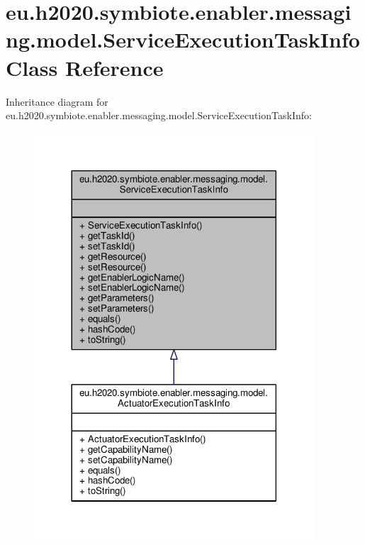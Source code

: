 \hypertarget{classeu_1_1h2020_1_1symbiote_1_1enabler_1_1messaging_1_1model_1_1ServiceExecutionTaskInfo}{}\section{eu.\+h2020.\+symbiote.\+enabler.\+messaging.\+model.\+Service\+Execution\+Task\+Info Class Reference}
\label{classeu_1_1h2020_1_1symbiote_1_1enabler_1_1messaging_1_1model_1_1ServiceExecutionTaskInfo}


Inheritance diagram for eu.\+h2020.\+symbiote.\+enabler.\+messaging.\+model.\+Service\+Execution\+Task\+Info\+:
\nopagebreak
\begin{figure}[H]
\begin{center}
\leavevmode
\includegraphics[width=296pt]{classeu_1_1h2020_1_1symbiote_1_1enabler_1_1messaging_1_1model_1_1ServiceExecutionTaskInfo__inherit__graph}
\end{center}
\end{figure}


